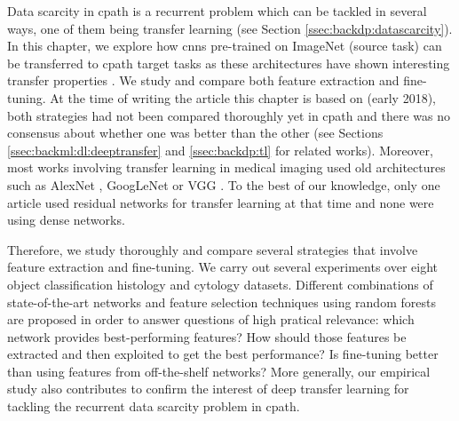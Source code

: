 
Data scarcity in \acrlong{cpath} is a recurrent problem which can be tackled in several ways, one of them being transfer learning (see Section \ref{ssec:backdp:datascarcity}). In this chapter, we explore how \acrlong{cnn}s pre-trained on ImageNet \cite{deng2009imagenet} (source task) can be transferred to \acrlong{cpath} target tasks as these architectures have shown interesting transfer properties \cite{donahue2014decaf,yosinski2014transferable,sermanet2013overfeat}. We study and compare both feature extraction and fine-tuning. At the time of writing the article this chapter is based on (early 2018), both strategies had not been compared thoroughly yet in \acrlong{cpath} and there was no consensus about whether one was better than the other (see Sections \ref{ssec:backml:dl:deeptransfer} and \ref{ssec:backdp:tl} for related works). Moreover, most works involving transfer learning in medical imaging used old architectures such as AlexNet \cite{shin2016deep,bayramoglu2016transfer,antony2016quantifying,ravishankar2016understanding,tajbakhsh2016convolutional,kumar2017comparative,kim2016deep}, GoogLeNet \cite{shin2016deep,bayramoglu2016transfer} or VGG \cite{kieffer2017convolutional,bayramoglu2016transfer,antony2016quantifying,yu2017deep,hou2016automatic,kumar2017comparative}. To the best of our knowledge, only one article used residual networks for transfer learning at that time \cite{yu2017deep} and none were using dense networks.

Therefore, we study thoroughly and compare several strategies that involve feature extraction and fine-tuning. We carry out several experiments over eight object classification histology and cytology datasets. Different combinations of state-of-the-art networks and feature selection techniques using random forests are proposed in order to answer questions of high pratical relevance: which network provides best-performing features? How should those features be extracted and then exploited to get the best performance? Is fine-tuning better than using features from off-the-shelf networks? More generally, our empirical study also contributes to confirm the interest of deep transfer learning for tackling the recurrent data scarcity problem in \acrlong{cpath}.

